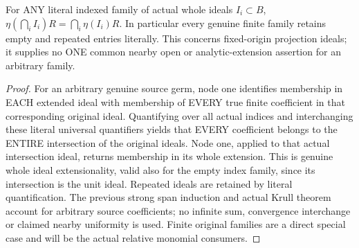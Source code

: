 \begin{theorem}
\label{hir:submersion-finite-intersection-entire-family}
\leanok
For ANY literal indexed family of actual whole ideals $I_i\subset B$,
$\eta(\bigcap_i I_i)R=\bigcap_i\eta(I_i)R$. In particular every genuine
finite family retains empty and repeated entries literally. This concerns
fixed-origin projection ideals; it supplies no ONE common nearby open or
analytic-extension assertion for an arbitrary family.
\end{theorem}
\begin{proof}
For an arbitrary genuine source germ, node one identifies membership in
EACH extended ideal with membership of EVERY true finite coefficient in
that corresponding original ideal. Quantifying over all actual indices
and interchanging these literal universal quantifiers yields that EVERY
coefficient belongs to the ENTIRE intersection of the original ideals.
Node one, applied to that actual intersection ideal, returns membership
in its whole extension. This is genuine whole ideal extensionality, valid
also for the empty index family, since its intersection is the unit ideal.
Repeated ideals are retained by literal quantification. The previous
strong span induction and actual Krull theorem account for arbitrary
source coefficients; no infinite sum, convergence interchange or claimed
nearby uniformity is used. Finite original families are a direct special
case and will be the actual relative monomial consumers.
\end{proof}

